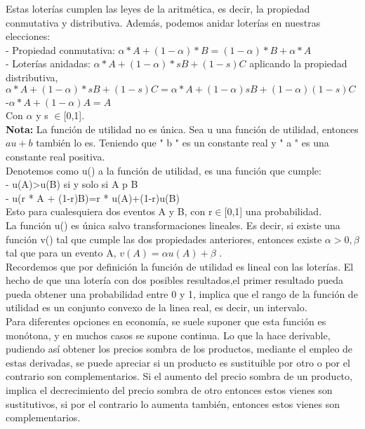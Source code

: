 \documentclass[10pt,a4paper]{book}
\begin{document}
Estas loterías cumplen las leyes de la aritmética, es decir, la propiedad conmutativa y distributiva. Además, podemos anidar loterías en nuestras elecciones:\\
	- Propiedad conmutativa: $\alpha * A +(1-\alpha)* B=(1-\alpha)* B + \alpha * A$ \\
	- Loterías anidadas: $\alpha * A +(1-\alpha)*{sB + (1-s)C}$ aplicando la propiedad distributiva, $\alpha * A +(1-\alpha)*{sB + (1-s)C} =\alpha * A +(1-\alpha)sB+(1-\alpha)(1-s)C$    \\
	-$\alpha * A+(1-\alpha)A=A$	\\

Con $\alpha$ y s $\in$[0,1].\\


\textbf{Nota:} La función de utilidad no es única. Sea u una función de utilidad, entonces $au+b$ también lo es. Teniendo que " b " es un constante real y " a " es una constante real positiva. \\ 

Denotemos como u() a la función de utilidad, es una función que cumple:\\
	- u(A)>u(B) si y solo si A p B \\
	- u(r * A + (1-r)B)=r * u(A)+(1-r)u(B)\\
Esto para cualesquiera dos eventos A y B, con r$\in$[0,1] una probabilidad.\\
La función u() es única salvo transformaciones lineales. Es decir, si existe una función v() tal que cumple las dos propiedades anteriores, entonces existe $\alpha >0 , \beta $ tal que para un evento A, $v(A)= \alpha u(A) + \beta$ . \\

Recordemos que por definición la función de utilidad es lineal con las loterías. El hecho de que una lotería con dos posibles resultados,el primer resultado pueda pueda obtener una probabilidad entre 0 y 1, implica que el rango de la función de utilidad es un conjunto convexo de la linea real, es decir, un intervalo.\\

Para diferentes opciones en economía, se suele suponer que esta función es monótona, y en muchos casos se supone continua. Lo que la hace derivable, pudiendo así obtener los precios sombra de los productos, mediante el empleo de estas derivadas, se puede apreciar si un producto es sustituible por otro o por el contrario son complementarios. Si el aumento del precio sombra de un producto, implica el decrecimiento del precio sombra de otro entonces estos vienes son sustitutivos, si por el contrario lo aumenta también, entonces estos vienes son complementarios.\\
\end{document}
